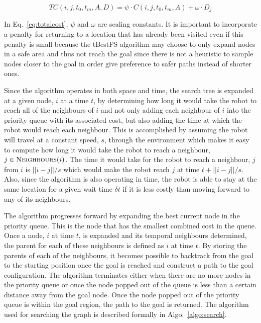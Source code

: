 \begin{equation}
    TC(i, j, t_0, t_m, A, D) = \psi \cdot C(i, j, t_0, t_m, A) +
    \omega \cdot D_j
    \label{eq:totalcost}
\end{equation}

In Eq.~\ref{eq:totalcost}, $\psi$ and $\omega$ are scaling constants. It is
important to incorporate a penalty for returning to a location that has already
been visited even if this penalty is small because the tBestFS algorithm may
choose to only expand nodes in a safe area and thus not reach the goal since
there is not a heuristic to sample nodes closer to the goal in order give
preference to safer paths instead of shorter ones.

Since the algorithm operates in both space and time, the search tree is
expanded at a given node, $i$ at a time $t$, by determining how long it would
take the robot to reach all of the neighbours of $i$ and not only adding each
neighbour of $i$ into the priority queue with its associated cost, but also
adding the time at which the robot would reach each neighbour. This is
accomplished by assuming the robot will travel at a constant speed, $s$,
through the environment which makes it easy to compute how long it would take
the robot to reach a neighbour, $j \in \Function{Neighbours}(i)$. The time it
would take for the robot to reach a neighbour, $j$ from $i$ is $||i - j|| / s$
which would make the robot reach $j$ at time $t + ||i - j|| / s$.  Also, since
the algorithm is also operating in time, the robot is able to stay at the same
location for a given wait time $\delta t$ if it is less costly than moving
forward to any of its neighbours.

The algorithm progresses forward by expanding the best current node in the
priority queue. This is the node that has the smallest combined cost in the
queue.  Once a node, $i$ at time $t$, is expanded and its temporal neighbours
determined, the parent for each of these neighbours is defined as $i$ at time
$t$. By storing the parents of each of the neighbours, it becomes possible to
backtrack from the goal to the starting position once the goal is reached and
construct a path to the goal configuration. The algorithm terminates either
when there are no more nodes in the priority queue or once the node popped out
of the queue is less than a certain distance away from the goal node. Once the
node popped out of the priority queue is within the goal region, the path to
the goal is returned. The algorithm used for searching the graph is described
formally in Algo.~\ref{algo:search}.

